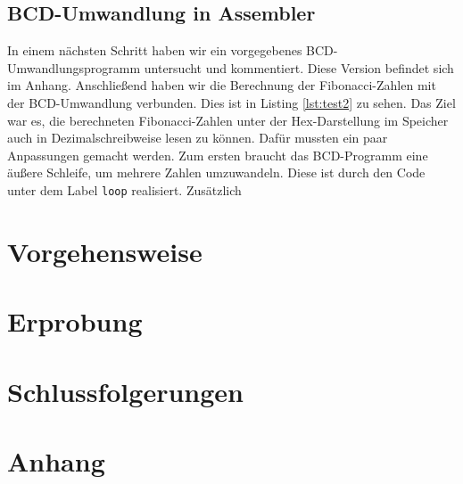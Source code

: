 \documentclass[12pt,a4paper]{scrartcl}
\begin{document}
\subsection*{BCD-Umwandlung in Assembler}
In einem n\"achsten Schritt haben wir ein vorgegebenes BCD-Umwandlungsprogramm untersucht und kommentiert.
Diese Version befindet sich im Anhang.
Anschlie\ss{}end haben wir die Berechnung der Fibonacci-Zahlen mit der BCD-Umwandlung verbunden.
Dies ist in Listing \ref{lst:test2} zu sehen.
Das Ziel war es, die berechneten Fibonacci-Zahlen unter der Hex-Darstellung im Speicher auch in Dezimalschreibweise lesen zu k\"onnen.
Daf\"ur mussten ein paar Anpassungen gemacht werden.
Zum ersten braucht das BCD-Programm eine \"au\ss{}ere Schleife, um mehrere Zahlen umzuwandeln.
Diese ist durch den Code unter dem Label \texttt{loop} realisiert.
Zus\"atzlich


\section{Vorgehensweise}

\section{Erprobung}

\section{Schlussfolgerungen}

\section{Anhang}
\clearpage
\clearpage
\end{document}
